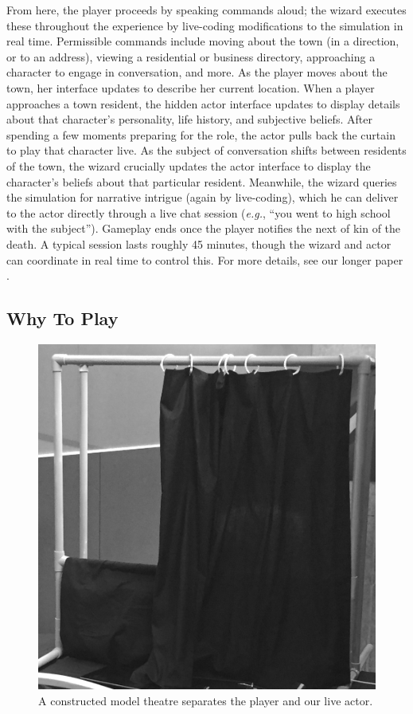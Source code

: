 \documentclass[letterpaper]{article}
\begin{document}
From here, the player proceeds by speaking commands aloud; the wizard executes these throughout the experience by live-coding modifications to the simulation in real time. Permissible commands include moving about the town (in a direction, or to an address), viewing a residential or business directory, approaching a character to engage in conversation, and more. As the player moves about the town, her interface updates to describe her current location. When a player approaches a town resident, the hidden actor interface updates to display details about that character's personality, life history, and subjective beliefs. After spending a few moments preparing for the role, the actor pulls back the curtain to play that character live. As the subject of conversation shifts between residents of the town, the wizard crucially updates the actor interface to display the character's beliefs about that particular resident. Meanwhile, the wizard queries the simulation for narrative intrigue (again by live-coding), which he can deliver to the actor directly through a live chat session (\textit{e.g.}, ``you went to high school with the subject''). Gameplay ends once the player notifies the next of kin of the death. A typical session lasts roughly 45 minutes, though the wizard and actor can coordinate in real time to control this. For more details, see our longer paper \cite{samuel2016bad}.


\subsection{Why To Play}


\begin{figure}[t]
  \centering
  \includegraphics[width=0.64\columnwidth]{images/bad_news-the_puppet_theatre}
  \caption{A constructed model theatre separates the player and our live actor.}
  \label{fig:bn-model_theatre}
\end{figure}
\end{document}
